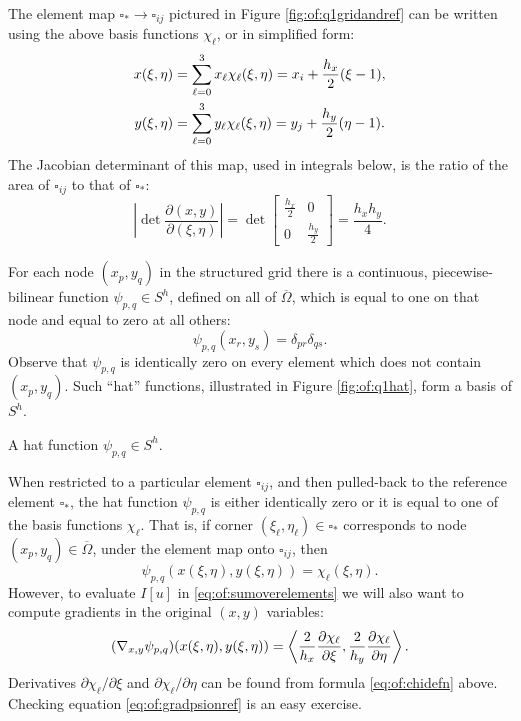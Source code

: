 The element map $\square_\ast \to \square_{ij}$ pictured in Figure \ref{fig:of:q1gridandref} can be written using the above basis functions $\chi_\ell$, or in simplified form:
\begin{align}
x(\xi,\eta) &= \sum_{\ell=0}^3 x_\ell \chi_\ell(\xi,\eta) = x_i + \frac{h_x}{2} (\xi-1), \label{eq:of:referencemap} \\
y(\xi,\eta) &= \sum_{\ell=0}^3 y_\ell \chi_\ell(\xi,\eta) = y_j + \frac{h_y}{2} (\eta-1). \notag
\end{align}
The Jacobian determinant of this map, used in integrals below, is the ratio of the area of $\square_{ij}$ to that of $\square_\ast$:
\begin{equation}
\left|\det\frac{\partial(x,y)}{\partial(\xi,\eta)}\right| = \det\begin{bmatrix} \frac{h_x}{2} & 0 \\ 0 & \frac{h_y}{2} \end{bmatrix} = \frac{h_x h_y}{4}. \label{eq:of:elementjacobian}
\end{equation}

For each node $(x_p,y_q)$ in the structured grid there is a continuous, piecewise-bilinear function $\psi_{p,q} \in S^h$, defined on all of $\overline\Omega$, which is equal to one on that node and equal to zero at all others:
\begin{equation}
  \psi_{p,q}(x_r,y_s) = \delta_{pr} \delta_{qs}.  \label{eq:of:psinodewise}
\end{equation}
Observe that $\psi_{p,q}$ is identically zero on every element which does not contain $(x_p,y_q)$.  Such ``hat'' functions, illustrated in Figure \ref{fig:of:q1hat}, form a basis of $S^h$.

\begin{marginfigure}

\caption{A hat function $\psi_{p,q} \in S^h$.}
\label{fig:of:q1hat}
\end{marginfigure}

When restricted to a particular element $\square_{ij}$, and then pulled-back to the reference element $\square_\ast$, the hat function $\psi_{p,q}$ is either identically zero or it is equal to one of the basis functions $\chi_\ell$.  That is, if corner $(\xi_\ell,\eta_\ell) \in \square_\ast$ corresponds to node $(x_p,y_q) \in \overline\Omega$, under the element map onto $\square_{ij}$, then
\begin{equation}
  \psi_{p,q}(x(\xi,\eta),y(\xi,\eta)) = \chi_\ell(\xi,\eta).  \label{eq:of:psionref}
\end{equation}
However, to evaluate $I[u]$ in \eqref{eq:of:sumoverelements} we will also want to compute gradients in the original $(x,y)$ variables:
\begin{equation}
  (\nabla_{x,y} \psi_{p,q})(x(\xi,\eta),y(\xi,\eta)) = \left<\frac{2}{h_x}\frac{\partial\chi_\ell}{\partial \xi},\frac{2}{h_y}\frac{\partial\chi_\ell}{\partial \eta}\right>.   \label{eq:of:gradpsionref}
\end{equation}
Derivatives $\partial\chi_\ell/\partial \xi$ and $\partial\chi_\ell/\partial \eta$ can be found from formula \eqref{eq:of:chidefn} above.  Checking equation \eqref{eq:of:gradpsionref} is an easy exercise.

